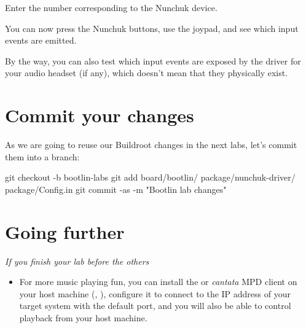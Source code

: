 Enter the number corresponding to the Nunchuk device.

You can now press the Nunchuk buttons, use the joypad, and see which
input events are emitted.

By the way, you can also test which input events are exposed by the
driver for your audio headset (if any), which doesn't mean that they physically
exist.

\section{Commit your changes}

As we are going to reuse our Buildroot changes in the next labs,
let's commit them into a branch:

\begin{bashinput}
git checkout -b bootlin-labs
git add board/bootlin/ package/nunchuk-driver/ package/Config.in
git commit -as -m "Bootlin lab changes"
\end{bashinput}

\section{Going further}

{\em If you finish your lab before the others}

\begin{itemize}
\item For more music playing fun, you can install the  or
  {\em cantata} MPD client on your host machine (, ), configure it to
  connect to the IP address of your target system with the default
  port, and you will also be able to control playback from your host
  machine.
\end{itemize}


